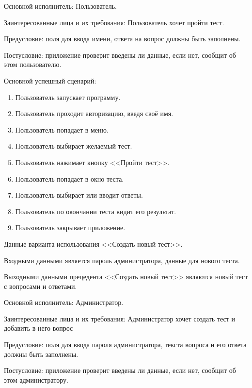 Основной исполнитель: Пользователь.

Заинтересованные лица и их требования: Пользователь хочет пройти тест.

Предусловие: поля для ввода имени, ответа на вопрос должны быть заполнены.

Постусловие: приложение проверит введены ли данные, если нет, сообщит об этом пользователю.

Основной успешный сценарий:
\begin{enumerate}
	\item Пользователь запускает программу.
	\item Пользователь проходит авторизацию, введя своё имя.
	\item Пользователь попадает в меню.
	\item Пользователь выбирает желаемый тест.
	\item Пользователь нажимает кнопку <<Пройти тест>>.
	\item Пользователь попадает в окно теста.
	\item Пользователь выбирает или вводит ответы.
	\item Пользователь по окончании теста видит его результат.
	\item Пользователь закрывает приложение.
\end{enumerate}

Данные варианта использования <<Создать новый тест>>.

Входными данными является пароль администратора, данные для нового теста.

Выходными данными прецедента <<Создать новый тест>> являются новый тест с вопросами и ответами.

Основной исполнитель: Администратор.

Заинтересованные лица и их требования: Администратор хочет создать тест и добавить в него вопрос

Предусловие: поля для ввода пароля администратора, текста вопроса и его ответа должны быть заполнены.

Постусловие: приложение проверит введены ли данные, если нет, сообщит об этом администратору.


